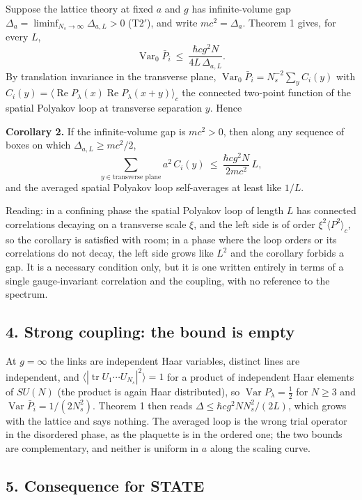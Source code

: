 \documentclass[11pt,a4paper]{article}
\begin{document}
Suppose the lattice theory at fixed \(a\) and \(g\) has infinite-volume
gap \(\Delta_a=\liminf_{N_s\to\infty}\Delta_{a,L}>0\) (T2\('\)), and
write \(mc^2=\Delta_a\). Theorem 1 gives, for every \(L\),
\[\operatorname{Var}_0\bar P_i\ \le\ \frac{\hbar cg^2N}{4L\,\Delta_{a,L}} .\]
By translation invariance in the transverse plane,
\(\operatorname{Var}_0\bar P_i=N_s^{-2}\sum_{y}C_i(y)\) with
\(C_i(y)=\langle\operatorname{Re}P_\lambda(x)\operatorname{Re}P_\lambda(x+y)\rangle_c\)
the connected two-point function of the spatial Polyakov loop at
transverse separation \(y\). Hence

\textbf{Corollary 2.} If the infinite-volume gap is \(mc^2>0\), then
along any sequence of boxes on which \(\Delta_{a,L}\ge mc^2/2\),
\[\sum_{y\in\text{transverse plane}}a^2\,C_i(y)\ \le\ \frac{\hbar cg^2N}{2mc^2}\,L ,\]
and the averaged spatial Polyakov loop self-averages at least like
\(1/L\).

Reading: in a confining phase the spatial Polyakov loop of length \(L\)
has connected correlations decaying on a transverse scale \(\xi\), and
the left side is of order \(\xi^2\langle P^2\rangle_c\), so the
corollary is satisfied with room; in a phase where the loop orders or
its correlations do not decay, the left side grows like \(L^2\) and the
corollary forbids a gap. It is a necessary condition only, but it is one
written entirely in terms of a single gauge-invariant correlation and
the coupling, with no reference to the spectrum.

\hypertarget{strong-coupling-the-bound-is-empty}{%
\subsection{4. Strong coupling: the bound is
empty}\label{strong-coupling-the-bound-is-empty}}

At \(g=\infty\) the links are independent Haar variables, distinct lines
are independent, and
\(\langle|\operatorname{tr}U_1\cdots U_{N_s}|^2\rangle=1\) for a product
of independent Haar elements of \(SU(N)\) (the product is again Haar
distributed), so \(\operatorname{Var}P_\lambda=\tfrac12\) for \(N\ge3\)
and \(\operatorname{Var}\bar P_i=1/(2N_s^2)\). Theorem 1 then reads
\(\Delta\le\hbar cg^2NN_s^2/(2L)\), which grows with the lattice and
says nothing. The averaged loop is the wrong trial operator in the
disordered phase, as the plaquette is in the ordered one; the two bounds
are complementary, and neither is uniform in \(a\) along the scaling
curve.

\hypertarget{consequence-for-state}{%
\subsection{5. Consequence for STATE}\label{consequence-for-state}}
\end{document}
